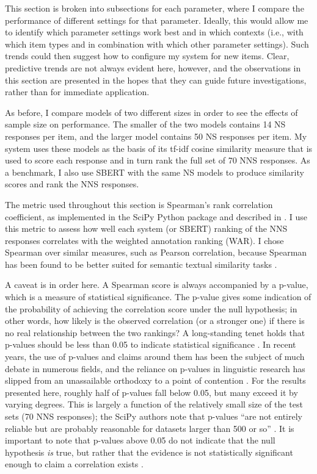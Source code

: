 This section is broken into subsections for each parameter, where I compare the performance of different settings for that parameter. Ideally, this would allow me to identify which parameter settings work best and in which contexts (i.e., with which item types and in combination with which other parameter settings). Such trends could then suggest how to configure my system for new items. Clear, predictive trends are not always evident here, however, and the observations in this section are presented in the hopes that they can guide future investigations, rather than for immediate application.

As before, I compare models of two different sizes in order to see the effects of sample size on performance. The smaller of the two models contains 14 NS responses per item, and the larger model contains 50 NS responses per item. My system uses these models as the basis of its tf-idf cosine similarity measure that is used to score each response and in turn rank the full set of 70 NNS responses. As a benchmark, I also use SBERT with the same NS models to produce similarity scores and rank the NNS responses.

The metric used throughout this section is Spearman's rank correlation coefficient, as implemented in the SciPy Python package \cite{2020scipy} and described in \citet{zwillinger1999crc}. I use this metric to assess how well each system (or SBERT) ranking of the NNS responses correlates with the weighted annotation ranking (WAR). I chose Spearman over similar measures, such as Pearson correlation, because Spearman has been found to be better suited for semantic textual similarity tasks \cite{reimers2016}.

A caveat is in order here. A Spearman score is always accompanied by a p-value, which is a measure of statistical significance. The p-value gives some indication of the probability of achieving the correlation score under the null hypothesis; in other words, how likely is the observed correlation (or a stronger one) if there is no real relationship between the two rankings? A long-standing tenet holds that p-values should be less than 0.05 to indicate statistical significance \cite{zar1972significance}. In recent years, the use of p-values and claims around them has been the subject of much debate in numerous fields, and the reliance on p-values in linguistic research has slipped from an unassailable orthodoxy to a point of contention \cite{moran2012revisiting, tomczak2014need}. For the results presented here, roughly half of p-values fall below 0.05, but many exceed it by varying degrees. This is largely a function of the relatively small size of the test sets (70 NNS responses); the SciPy authors note that p-values ``are not entirely reliable but are probably reasonable for datasets larger than 500 or so'' \cite{2020scipy}. It is important to note that p-values above 0.05 do not indicate that the null hypothesis \textit{is} true, but rather that the evidence is not statistically significant enough to claim a correlation exists \cite{vasishth2016statistical}.


